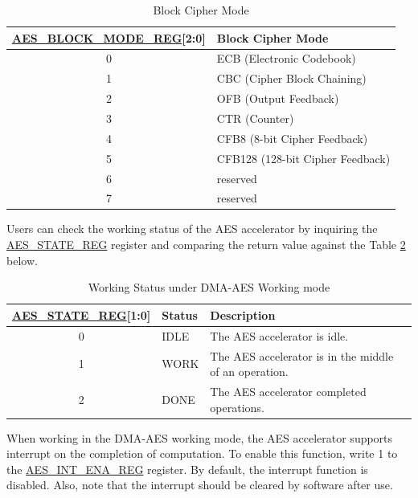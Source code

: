 \documentclass[main\_\_EN.tex]{subfiles}
\begin{document}
\begin{longtable}[c]{ | c | l | }
\caption{Block Cipher Mode}
\label{tab:aes-block-mode}
\\\hline 
\rowcolor{lightgray}
\textbf{\hyperref[regdesc:AESBLOCKMODEREG]{AES\_BLOCK\_MODE\_REG}[2:0]}     & \textbf{Block Cipher Mode}\\
    \hline
    0                          & ECB (Electronic Codebook)    \\
    \hline
    1                          & CBC (Cipher Block Chaining)     \\
    \hline
    2                          & OFB (Output Feedback)    \\
    \hline
    3                          & CTR (Counter)    \\
    \hline
    4                          & CFB8 (8-bit Cipher Feedback)    \\
    \hline
    5                          & CFB128 (128-bit Cipher Feedback) \\
    \hline
    6                         & reserved \\
    \hline
    7                         & reserved \\
    \hline
\end{longtable}

Users can check the working status of the AES accelerator by inquiring the \hyperref[regdesc:AESSTATEREG]{AES\_STATE\_REG} register and comparing the return value against the Table \ref{tab:aes-state-value-dma} below.

\begin{longtable}[c]{ | c | l | l | }
\caption{Working Status under DMA-AES Working mode}
\label{tab:aes-state-value-dma}
\\\hline 
\rowcolor{lightgray}
\textbf{\hyperref[regdesc:AESSTATEREG]{AES\_STATE\_REG}[1:0]} & \textbf{Status} &  \textbf{Description} \\ \hline

    0                   & IDLE      &   The AES accelerator is idle.\\ \hline
    1                   & WORK      &   The AES accelerator is in the middle of an operation.     \\ \hline
    2                   & DONE      &   The AES accelerator completed operations.     \\ \hline
\end{longtable}

When working in the DMA-AES working mode, the AES accelerator supports interrupt on the completion of computation. To enable this function, write 1 to the \hyperref[regdesc:AESINTENAREG]{AES\_INT\_ENA\_REG} register. By default, the interrupt function is disabled. Also, note that the interrupt should be cleared by software after use.
\end{document}
